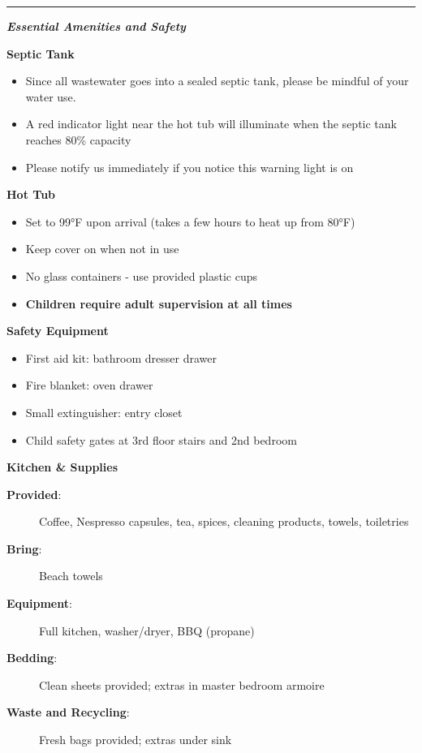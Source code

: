 \documentclass[11pt,a4paper]{article}
\newcommand{\mysection}[1]{
    \vspace{1.5em}
    {\color{skybluescript}\huge\bfseries\itshape #1}
    \vspace{1em}
    \newline
}
\newcommand{\separator}{\vspace{1em}\hrule\vspace{1em}}
\begin{document}
\separator

\mysection{Essential Amenities and Safety}

\textbf{Septic Tank}
\begin{itemize}
    \item Since all wastewater goes into a sealed septic tank, please be mindful of your water use.
    \item A red indicator light near the hot tub will illuminate when the septic tank reaches 80\% capacity
    \item Please notify us immediately if you notice this warning light is on
\end{itemize}

\textbf{Hot Tub}
\begin{itemize}
    \item Set to 99°F upon arrival (takes a few hours to heat up from 80°F)
    \item Keep cover on when not in use
    \item No glass containers - use provided plastic cups
    \item \textbf{Children require adult supervision at all times}
\end{itemize}


\textbf{Safety Equipment}
\begin{itemize}
    \item First aid kit: bathroom dresser drawer
    \item Fire blanket: oven drawer
    \item Small extinguisher: entry closet
    \item Child safety gates at 3rd floor stairs and 2nd bedroom
\end{itemize}

\vspace{1em}
\noindent\textbf{Kitchen \& Supplies}
\begin{description}
    \item[\textbf{Provided}:] Coffee, Nespresso capsules, tea, spices, cleaning products, towels, toiletries
    \item[\textbf{Bring}:] Beach towels
    \item[\textbf{Equipment}:] Full kitchen, washer/dryer, BBQ (propane)
    \item[\textbf{Bedding}:] Clean sheets provided; extras in master bedroom armoire
    \item[\textbf{Waste and Recycling}:] Fresh bags provided; extras under sink
\end{description}
\end{document}
